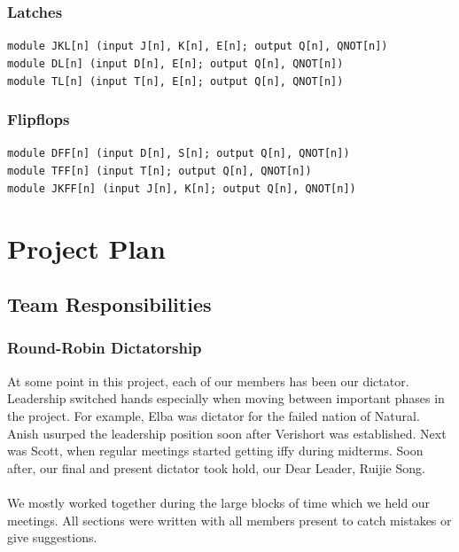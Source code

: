\documentclass[letterpaper,11pt]{article}
\begin{document}
        \subsubsection{Latches}
        \texttt{module JKL[n] (input J[n], K[n], E[n]; output Q[n], QNOT[n]) \\
        module DL[n] (input D[n], E[n]; output Q[n], QNOT[n]) \\
        module TL[n] (input T[n], E[n]; output Q[n], QNOT[n])}
        
        \subsubsection{Flipflops}
        \texttt{module DFF[n] (input D[n], S[n]; output Q[n], QNOT[n]) \\
        module TFF[n] (input T[n]; output Q[n], QNOT[n]) \\
        module JKFF[n] (input J[n], K[n]; output Q[n], QNOT[n])}
        
        

\section{Project Plan}
    \subsection{Team Responsibilities}
        \subsubsection{Round-Robin Dictatorship}
        At some point in this project, each of our members has been our dictator. Leadership switched hands especially when
        moving between important phases in the project. For example, Elba was dictator for the failed nation of Natural. Anish
        usurped the leadership position soon after Verishort was established. Next was Scott, when regular meetings started
        getting iffy during midterms. Soon after, our final and present dictator took hold, our Dear Leader, Ruijie Song.\\\\
        We mostly worked together during the large blocks of time which we held our meetings. All sections were written with
        all members present to catch mistakes or give suggestions. 
\end{document}
